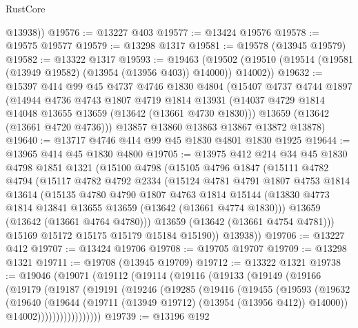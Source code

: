 \begin{lexlean}{RustCore}
\begin{coremodule}
        @13938))
@19576 := @13227 @403
@19577 := @13424 @19576
@19578 := @19575 @19577
@19579 := @13298 @1317
@19581 := @19578 (@13945 @19579)
@19582 := @13322 @1317
@19593 := @19463
    (@19502 (@19510 (@19514 (@19581 (@13949 @19582) (@13954 (@13956 @403)) @14000)) @14002))
@19632 := @15397
    @414
    @99
    @45
    @4737
    @4746
    @1830
    @4804
    (@15407
      @4737
      @4744
      @1897
      (@14944
        @4736
        @4743
        @1807
        @4719
        @1814
        @13931
        (@14037 @4729 @1814 @14048 @13655 @13659 (@13642 (@13661 @4730 @1830)))
        @13659
        (@13642 (@13661 @4720 @4736)))
      @13857
      @13860
      @13863
      @13867
      @13872
      @13878)
@19640 := @13717 @4746 @414 @99 @45 @1830 @4801 @1830 @1925
@19644 := @13965 @414 @45 @1830 @4800
@19705 := @13975
    @412
    @214
    @34
    @45
    @1830
    @4798
    @1851
    @1321
    (@15100
      @4798
      (@15105
        @4796
        @1847
        (@15111
          @4782
          @4794
          (@15117
            @4782
            @4792
            @2334
            (@15124
              @4781
              @4791
              @1807
              @4753
              @1814
              @13614
              (@15135
                @4780
                @4790
                @1807
                @4763
                @1814
                @15144
                (@13830 @4773 @1814 @13841 @13655 @13659 (@13642 (@13661 @4774 @1830)))
                @13659
                (@13642 (@13661 @4764 @4780)))
              @13659
              (@13642 (@13661 @4754 @4781)))
            @15169
            @15172
            @15175
            @15179
            @15184
            @15190))
        @13938))
@19706 := @13227 @412
@19707 := @13424 @19706
@19708 := @19705 @19707
@19709 := @13298 @1321
@19711 := @19708 (@13945 @19709)
@19712 := @13322 @1321
@19738 := @19046
    (@19071
      (@19112
        (@19114
          (@19116
            (@19133
              (@19149
                (@19166
                  (@19179
                    (@19187
                      (@19191
                        (@19246
                          (@19285
                            (@19416
                              (@19455
                                (@19593
                                  (@19632
                                    (@19640
                                      (@19644
                                        (@19711 (@13949 @19712) (@13954 (@13956 @412)) @14000))
                                      @14002)))))))))))))))))
@19739 := @13196 @192

\end{coremodule}
\end{lexlean}
